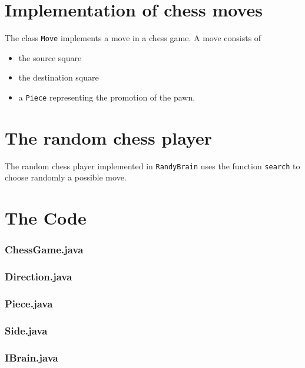 \documentclass [12pt ,a4paper, naustrian]{scrartcl}
\theoremstyle{plain}
\theoremstyle{definition}
\theoremstyle{remark}
\begin{document}
\section{Implementation of chess moves}
		The class \verb+Move+ implements a move in a chess game. A move consists of 
		\begin{itemize}
			\item the source square
			\item the destination square
			\item a \verb+Piece+ representing the promotion of the pawn.
		\end{itemize}
		
\section{The random chess player}
	The random chess player implemented in \verb+RandyBrain+ uses the function \verb+search+ to choose randomly a possible move.

\section{The Code}

\subsubsection*{ChessGame.java}


\subsubsection*{Direction.java}


\subsubsection*{Piece.java}


\subsubsection*{Side.java}


\subsubsection*{IBrain.java}

\end{document}
